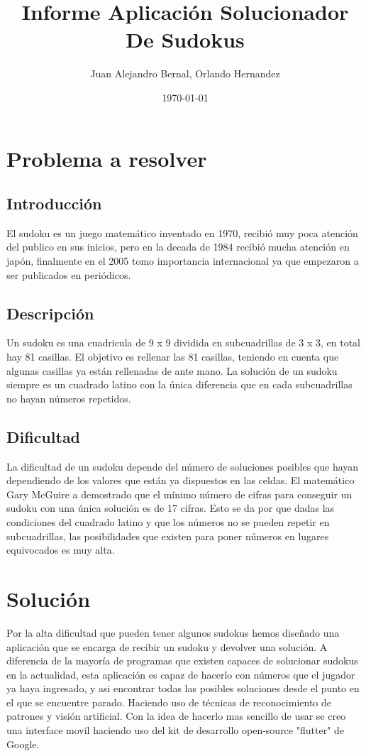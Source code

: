 \documentclass{article}
\author{Juan Alejandro Bernal, Orlando Hernandez}
\title{\textbf{Informe Aplicaci\'on Solucionador De Sudokus}}
\date{\today}
\begin{document}
\maketitle
\section{Problema a resolver}
\subsection{Introducción}
El sudoku es un juego matemático inventado en 1970,  
recibió muy poca atención del publico en sus inicios, pero en 
la decada de 1984 recibió mucha atención en japón, finalmente
en el 2005 tomo importancia internacional ya que empezaron
a ser publicados en periódicos.
\subsection{Descripción}
Un sudoku es una cuadricula de 9 x 9  dividida en subcuadrillas
de 3 x 3, en total hay 81 casillas. El objetivo es rellenar las
81 casillas, teniendo en cuenta que algunas casillas ya están rellenadas
de ante mano. La solución de un sudoku siempre es un cuadrado latino con la única 
diferencia que en cada subcuadrillas no hayan números repetidos.
\subsection{Dificultad}
La dificultad de un sudoku depende del número de soluciones posibles que hayan 
dependiendo de los valores que están ya dispuestos en las celdas. El matemático Gary
McGuire a demostrado que el mínimo número de cifras para conseguir un sudoku con una única solución es de 17 cifras.
Esto se da por que dadas las condiciones del cuadrado latino y que los números no se pueden
repetir en subcuadrillas, las posibilidades que existen para poner números en lugares equivocados
es muy alta. 
\section{Solución}
Por la alta dificultad que pueden tener algunos sudokus hemos diseñado una aplicación que se
encarga de recibir un sudoku y devolver una solución. A diferencia de la mayoría
de programas que existen capaces de solucionar sudokus en la actualidad, esta aplicación
es capaz de hacerlo con números que el jugador ya haya ingresado, y asi encontrar todas las
posibles soluciones desde el punto en el que se encuentre parado.
Haciendo uso de técnicas de reconocimiento de patrones y visión artificial. 
Con la idea de hacerlo mas sencillo de usar se creo una interface movil
haciendo uso del kit de desarrollo open-source "flutter" de Google. 
\end{document}
